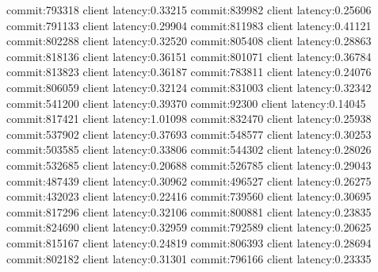 commit:793318 client latency:0.33215
commit:839982 client latency:0.25606
commit:791133 client latency:0.29904
commit:811983 client latency:0.41121
commit:802288 client latency:0.32520
commit:805408 client latency:0.28863
commit:818136 client latency:0.36151
commit:801071 client latency:0.36784
commit:813823 client latency:0.36187
commit:783811 client latency:0.24076
commit:806059 client latency:0.32124
commit:831003 client latency:0.32342
commit:541200 client latency:0.39370
commit:92300 client latency:0.14045
commit:817421 client latency:1.01098
commit:832470 client latency:0.25938
commit:537902 client latency:0.37693
commit:548577 client latency:0.30253
commit:503585 client latency:0.33806
commit:544302 client latency:0.28026
commit:532685 client latency:0.20688
commit:526785 client latency:0.29043
commit:487439 client latency:0.30962
commit:496527 client latency:0.26275
commit:432023 client latency:0.22416
commit:739560 client latency:0.30695
commit:817296 client latency:0.32106
commit:800881 client latency:0.23835
commit:824690 client latency:0.32959
commit:792589 client latency:0.20625
commit:815167 client latency:0.24819
commit:806393 client latency:0.28694
commit:802182 client latency:0.31301
commit:796166 client latency:0.23335